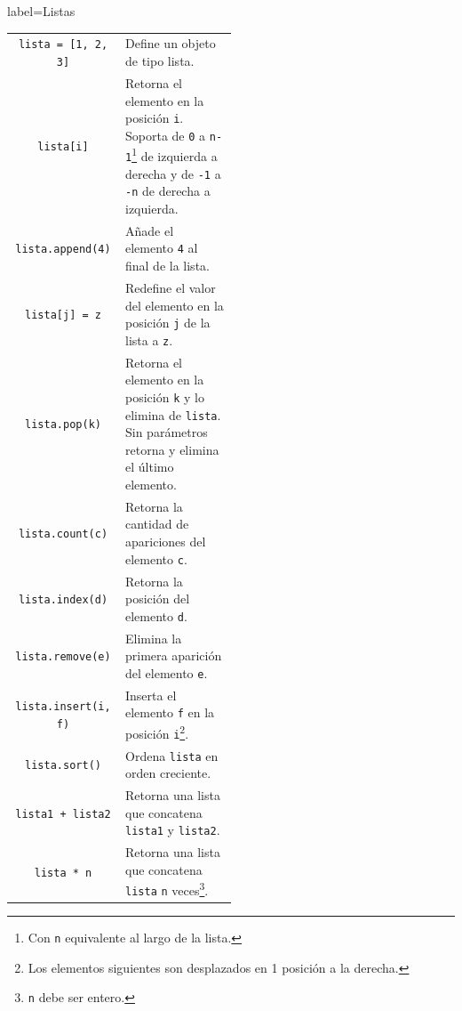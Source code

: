 \documentclass[10pt]{article}
\begin{document}
\begin{multicols*}{3}
\begin{contentbox}{label=Listas}
    \begin{tabular}{C|p{0.5\linewidth}}
        \lstinline!lista = [1, 2, 3]! & Define un objeto de tipo lista. \\
        \lstinline!lista[i]! & Retorna el elemento en la posición \lstinline!i!. Soporta de \lstinline!0! a \lstinline!n-1!\footnote{Con \lstinline!n! equivalente al largo de la lista.} de izquierda a derecha y de \lstinline!-1! a \lstinline!-n! de derecha a izquierda. \\
        \lstinline!lista.append(4)! & Añade el elemento \lstinline!4! al final de la lista. \\
        \lstinline!lista[j] = z! & Redefine el valor del elemento en la posición \lstinline!j! de la lista a \lstinline!z!. \\
        \lstinline!lista.pop(k)! & Retorna el elemento en la posición \lstinline!k! y lo elimina de \lstinline!lista!. Sin parámetros retorna y elimina el último elemento. \\
        \lstinline!lista.count(c)! & Retorna la cantidad de apariciones del elemento \lstinline!c!. \\
        \lstinline!lista.index(d)! & Retorna la posición del elemento \lstinline!d!. \\
        \lstinline!lista.remove(e)! & Elimina la primera aparición del elemento \lstinline!e!. \\
        \lstinline!lista.insert(i, f)! & Inserta el elemento \lstinline!f! en la posición \lstinline!i!\footnote{Los elementos siguientes son desplazados en 1 posición a la derecha.}. \\
        \lstinline!lista.sort()! & Ordena \lstinline!lista! en orden creciente. \\
        \lstinline!lista1 + lista2! & Retorna una lista que concatena \lstinline!lista1! y \lstinline!lista2!. \\
        \lstinline!lista * n! & Retorna una lista que concatena \lstinline!lista! \lstinline!n! veces\footnote{\lstinline!n! debe ser entero.}. \\
    \end{tabular}
\end{contentbox}

    

\end{multicols*}
\end{document}
